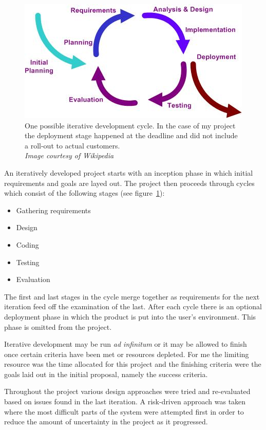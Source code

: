 \documentclass[12pt,a4paper,twoside]{scrbook}
\begin{document}
\begin{figure}
  \centering
  \includegraphics{./figs/Iterative_development_model_V2.jpg}
  \caption{One possible iterative development cycle. In the case of my project
    the deployment stage happened at the deadline and did not include a roll-out
    to actual customers. \\ \emph{Image courtesy of Wikipedia}}
  \label{fig:iterative}
\end{figure}

An iteratively developed project starts with an inception phase in which initial
requirements and goals are layed out. The project then proceeds through cycles
which consist of the following stages (see figure~\ref{fig:iterative}):

\begin{itemize}
\item
  Gathering requirements
\item
  Design
\item
  Coding
\item
  Testing
\item
  Evaluation
\end{itemize}

The first and last stages in the cycle merge together as requirements for the
next iteration feed off the examination of the last. After each cycle there is
an optional deployment phase in which the product is put into the user's
environment. This phase is omitted from the project.

Iterative development may be run \emph{ad infinitum} or it may be allowed to
finish once certain criteria have been met or resources depleted. For me the
limiting resource was the time allocated for this project and the finishing
criteria were the goals laid out in the initial proposal, namely the success
criteria.

Throughout the project various design approaches were tried and re-evaluated
based on issues found in the last iteration. A risk-driven approach was taken
where the most difficult parts of the system were attempted first in order to
reduce the amount of uncertainty in the project as it progressed.
\end{document}
